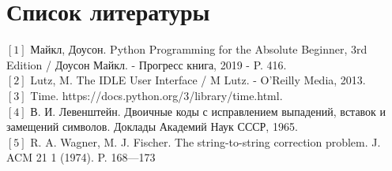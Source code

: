 %
\chapter{Список литературы}
\noindent$[1]$ Майкл, Доусон. Python Programming for the Absolute Beginner, 3rd Edition / Доусон Майкл. - Прогресс книга, 2019 - P. 416.\\
$[2]$ Lutz, M. The IDLE User Interface / M Lutz. - O’Reilly Media, 2013.\\
$[3]$ Time. https://docs.python.org/3/library/time.html.\\
$[4]$ В. И. Левенштейн. Двоичные коды с исправлением выпадений, вставок и замещений символов. Доклады Академий Наук СССР, 1965.\\
$[5]$ R. A. Wagner, M. J. Fischer. The string-to-string correction problem. J. ACM 21 1 (1974). P. 168—173